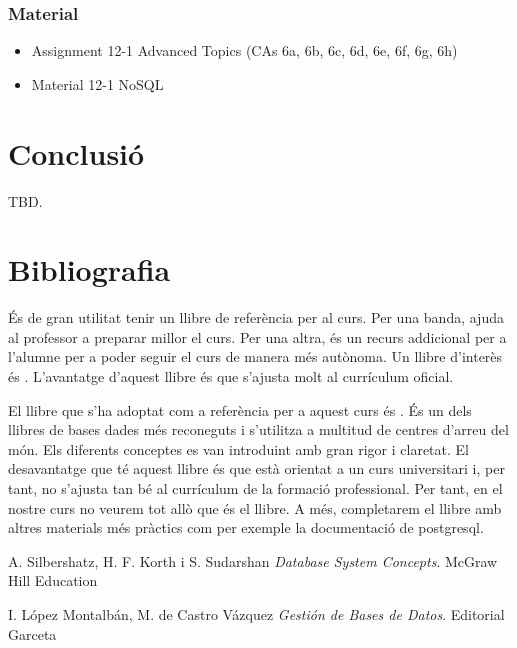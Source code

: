 \documentclass[catalan, a4paper, 12pt, titlepage]{article}
\begin{document}
  \subsubsection{Material}
  \begin{itemize}
	  \item Assignment 12-1 Advanced Topics (CAs 6a, 6b, 6c, 6d, 6e, 6f, 6g, 6h)
	  \item Material 12-1 NoSQL
  \end{itemize}


\section{Conclusió}
TBD.

\section{Bibliografia}

És de gran utilitat tenir un llibre de referència per al curs.
Per una banda, ajuda al professor a preparar millor el curs.
Per una altra, és un recurs addicional per a l'alumne per a poder seguir el curs de manera més autònoma.
Un llibre d'interès és \cite{montalban2014}.
L'avantatge d'aquest llibre és que s'ajusta molt al currículum oficial.

El llibre que s'ha adoptat com a referència per a aquest curs és \cite{silbershatz2020}.
És un dels llibres de bases dades més reconeguts i s'utilitza a multitud de centres d'arreu del món.
Els diferents conceptes es van introduint amb gran rigor i claretat.
El desavantatge que té aquest llibre és que està orientat a un curs universitari i, per tant, no s'ajusta tan bé al currículum de la formació professional.
Per tant, en el nostre curs no veurem tot allò que és el llibre.
A més, completarem el llibre amb altres materials més pràctics com per exemple la documentació de postgresql.

\begin{thebibliography}{9}
A. Silbershatz, H. F. Korth i S. Sudarshan 
\textit{Database System Concepts}. 
McGraw Hill Education

I. López Montalbán, M. de Castro Vázquez
\textit{Gestión de Bases de Datos}. 
Editorial Garceta

\end{thebibliography}
\end{document}
